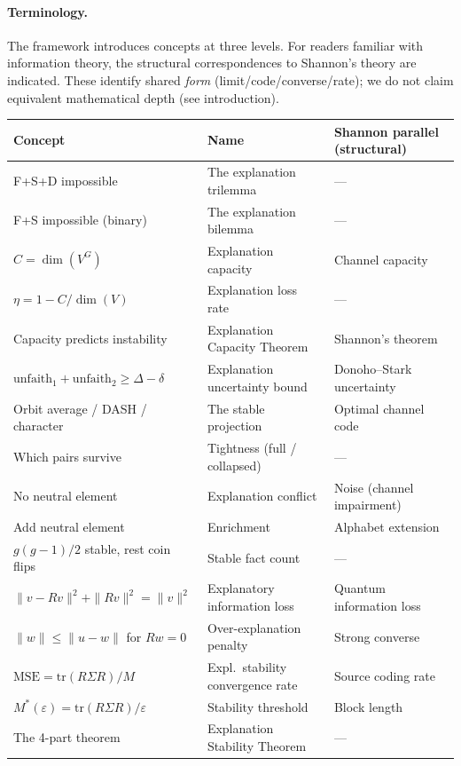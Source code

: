 \documentclass[11pt,a4paper]{article}
\begin{document}
\paragraph{Terminology.}
The framework introduces concepts at three levels.  For readers familiar
with information theory, the structural correspondences to Shannon's
theory are indicated.  These identify shared \emph{form}
(limit/code/converse/rate); we do not claim equivalent mathematical
depth (see introduction).
\begin{center}
\small
\begin{tabular}{@{}p{3.5cm}p{4cm}p{5cm}@{}}
\toprule
\textbf{Concept} & \textbf{Name} & \textbf{Shannon parallel (structural)} \\
\midrule
F+S+D impossible & The explanation trilemma & --- \\
F+S impossible (binary) & The explanation bilemma & --- \\
$C = \dim(V^G)$ & Explanation capacity & Channel capacity \\
$\eta = 1 - C/\dim(V)$ & Explanation loss rate & --- \\
Capacity predicts instability & Explanation Capacity Theorem & Shannon's theorem \\
$\mathrm{unfaith}_1 + \mathrm{unfaith}_2 \geq \Delta - \delta$ & Explanation uncertainty bound & Donoho--Stark uncertainty \\
Orbit average / DASH / character & The stable projection & Optimal channel code \\
Which pairs survive & Tightness (full / collapsed) & --- \\
No neutral element & Explanation conflict & Noise (channel impairment) \\
Add neutral element & Enrichment & Alphabet extension \\
$g(g{-}1)/2$ stable, rest coin flips & Stable fact count & --- \\
$\|v{-}Rv\|^2 + \|Rv\|^2 = \|v\|^2$ & Explanatory information loss & Quantum information loss \\
$\|w\| \leq \|u{-}w\|$ for $Rw{=}0$ & Over-explanation penalty & Strong converse \\
$\text{MSE} = \text{tr}(R\Sigma R)/M$ & Expl.\ stability convergence rate & Source coding rate \\
$M^*(\varepsilon) = \text{tr}(R\Sigma R)/\varepsilon$ & Stability threshold & Block length \\
The 4-part theorem & Explanation Stability Theorem & --- \\
\bottomrule
\end{tabular}
\end{center}
\end{document}
